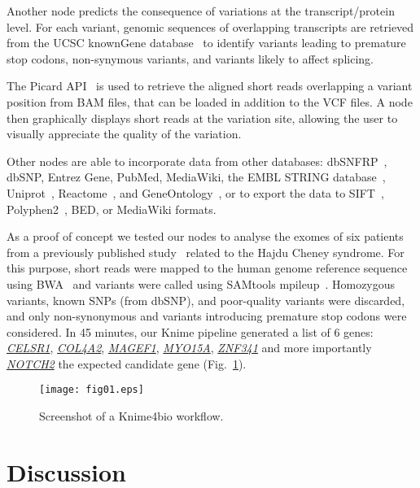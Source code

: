 \documentclass{bioinfo}
\begin{document}
Another node predicts the consequence of variations at the transcript/protein level. For each variant, genomic sequences of overlapping transcripts are retrieved from the UCSC knownGene database~\citep{pmid16500937} to identify variants leading to premature stop codons, non-synymous variants, and variants likely to affect splicing.

The Picard API~\citep{pmid19505943} is used to retrieve the aligned short reads overlapping a variant position from BAM files, that can be loaded in addition to the VCF files. A node then graphically displays short reads at the variation site, allowing the user to visually appreciate the quality of the variation.

Other nodes are able to incorporate data from other databases: dbSNFRP~\citep{pmid21520341}, dbSNP, Entrez Gene, PubMed, MediaWiki, the EMBL STRING database~\citep{pmid17098935}, Uniprot~\citep{pmid21447597}, Reactome~\citep{pmid21067998}, and GeneOntology~\citep{pmid18957448}, or to export the data to SIFT~\citep{pmid11337480}, Polyphen2~\citep{pmid20354512}, BED, or MediaWiki formats.

As a proof of concept we tested our nodes to analyse the exomes of six patients from a previously published study~\citep{pmid21378989} related to the Hajdu Cheney syndrome. For this purpose, short reads were mapped to the human genome reference sequence using BWA~\citep{pmid20080505} and variants were called using SAMtools mpileup~\citep{pmid19505943}. Homozygous variants, known SNPs (from dbSNP), and poor-quality variants were discarded, and only non-synonymous and variants introducing premature stop codons were considered. In 45 minutes, our Knime pipeline generated a list of 6 genes: \href{http://www.ncbi.nlm.nih.gov/gene/9620}{\textit{CELSR1}},  \href{http://www.ncbi.nlm.nih.gov/gene/1284}{\textit{COL4A2}}, \href{http://www.ncbi.nlm.nih.gov/gene/64110}{\textit{MAGEF1}}, \href{http://www.ncbi.nlm.nih.gov/gene/51168}{\textit{MYO15A}}, \href{http://www.ncbi.nlm.nih.gov/gene/84905}{\textit{ZNF341}} and more importantly \href{http://www.ncbi.nlm.nih.gov/gene/4853}{\textit{NOTCH2}} the expected candidate gene (Fig.~\ref{fig:x1}).

\begin{figure}[!tpb]%
\centerline{\texttt{[image: fig01.eps]}}
\caption{Screenshot of a Knime4bio workflow.}\label{fig:x1}
\end{figure}

\section{Discussion}
\end{document}
